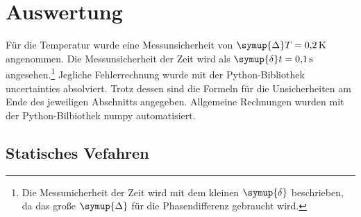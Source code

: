 \section{Auswertung}
\label{sec:Auswertung}
Für die Temperatur wurde eine Messunsicherheit von $\symup{\Delta} T = \SI{0.2}{\kelvin}$ angenommen. Die Messunsicherheit der Zeit wird als
$\symup{\delta} t = \SI{0.1}{\second}$ angesehen.\footnote{Die Messunicherheit der Zeit wird mit dem kleinen $\symup{\delta}$ beschrieben, 
da das große $\symup{\Delta}$ für die Phasendifferenz gebraucht wird.} Jegliche Fehlerrechnung wurde mit der Python-Bibliothek 
uncertainties \cite{uncertainties} absolviert. Trotz dessen sind die Formeln für die Unsicherheiten am Ende des jeweiligen Abschnitts angegeben. 
Allgemeine Rechnungen wurden mit der Python-Bilbiothek numpy \cite{numpy} automatisiert.

\subsection{Statisches Vefahren}  
